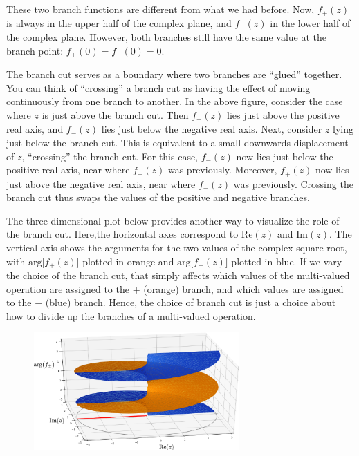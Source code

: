 \documentclass[10pt,a4paper]{article}
\begin{document}
These two branch functions are different from what we had before. Now,
$f_+(z)$ is always in the upper half of the complex plane, and
$f_-(z)$ in the lower half of the complex plane. However, both
branches still have the same value at the branch point: $f_+(0) =
f_-(0) = 0$.

The branch cut serves as a boundary where two branches are ``glued''
together. You can think of ``crossing'' a branch cut as having the
effect of moving continuously from one branch to another. In the above
figure, consider the case where $z$ is just above the branch cut. Then
$f_+(z)$ lies just above the positive real axis, and $f_-(z)$ lies
just below the negative real axis. Next, consider $z$ lying just below
the branch cut. This is equivalent to a small downwards displacement
of $z$, ``crossing'' the branch cut. For this case, $f_-(z)$ now lies
just below the positive real axis, near where $f_+(z)$ was
previously. Moreover, $f_+(z)$ now lies just above the negative real
axis, near where $f_-(z)$ was previously. Crossing the branch cut thus
swaps the values of the positive and negative branches.

The three-dimensional plot below provides another way to visualize the
role of the branch cut.  Here,the horizontal axes correspond to
$\mathrm{Re}(z)$ and $\mathrm{Im}(z)$. The vertical axis shows the
arguments for the two values of the complex square root, with
$\mathrm{arg}\big[f_+(z)\big]$ plotted in orange and
$\mathrm{arg}\big[f_-(z)\big]$ plotted in blue. If we vary the choice
of the branch cut, that simply affects which values of the
multi-valued operation are assigned to the $+$ (orange) branch, and
which values are assigned to the $-$ (blue) branch. Hence, the choice
of branch cut is just a choice about how to divide up the branches of
a multi-valued operation.

\begin{figure}[h]
  \centering\includegraphics[width=0.7\textwidth]{branches}
\end{figure}
\end{document}
